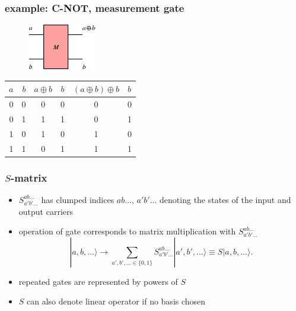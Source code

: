 \documentclass{beamer}
\begin{document}
%
\begin{frame}
    \frametitle{example: C-NOT, measurement gate}
    \begin{figure}
		\centering
        \includegraphics[width=3cm]{fig/mGate.png}
    \end{figure}
    \begin{table}
        \begin{tabular}{rr|cc|cl}
            $a$&$b$&$a\oplus b$&$b$&$(a\oplus b)\oplus b$&$b$\\
            \hline\hline
            0&0&0&0&0&0\\
            0&1&1&1&0&1\\
            1&0&1&0&1&0\\
            1&1&0&1&1&1
        \end{tabular}
    \end{table}
\end{frame}
%
\begin{frame}
	\frametitle{$S$-matrix}
	\begin{itemize}
		\item $S_{a'b'\ldots}^{ab\ldots}$ has clumped indices $ab\ldots$, $a'b'\ldots$ denoting the states of the input and output carriers
		\item operation of gate corresponds to matrix multiplication with $S_{a'b'\ldots}^{ab\ldots}$
		\begin{equation}
            |a,b,\ldots\rangle\to\sum_{a',b',\ldots\in\{0,1\}} S_{a'b'\ldots}^{ab\ldots}|a',b',\ldots\rangle\equiv S|a,b,\ldots\rangle.
		\end{equation}
		\item repeated gates are represented by powers of $S$
		\item $S$ can also denote linear operator if no basis chosen
	\end{itemize}
\end{frame}
%
\end{document}
